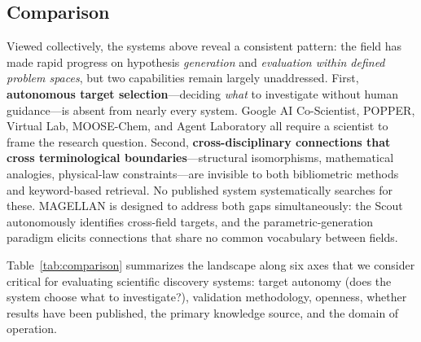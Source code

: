 \subsection{Comparison}

Viewed collectively, the systems above reveal a consistent pattern: the field has made rapid progress on hypothesis \emph{generation} and \emph{evaluation within defined problem spaces}, but two capabilities remain largely unaddressed. First, \textbf{autonomous target selection}---deciding \emph{what} to investigate without human guidance---is absent from nearly every system. Google AI Co-Scientist, POPPER, Virtual Lab, MOOSE-Chem, and Agent Laboratory all require a scientist to frame the research question. Second, \textbf{cross-disciplinary connections that cross terminological boundaries}---structural isomorphisms, mathematical analogies, physical-law constraints---are invisible to both bibliometric methods and keyword-based retrieval. No published system systematically searches for these. MAGELLAN is designed to address both gaps simultaneously: the Scout autonomously identifies cross-field targets, and the parametric-generation paradigm elicits connections that share no common vocabulary between fields.

Table~\ref{tab:comparison} summarizes the landscape along six axes that we consider critical for evaluating scientific discovery systems: target autonomy (does the system choose what to investigate?), validation methodology, openness, whether results have been published, the primary knowledge source, and the domain of operation.


